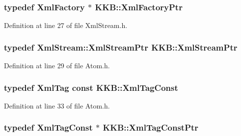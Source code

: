 \subsubsection[{\texorpdfstring{Xml\+Factory\+Ptr}{XmlFactoryPtr}}]{\setlength{\rightskip}{0pt plus 5cm}typedef {\bf Xml\+Factory} $\ast$ {\bf K\+K\+B\+::\+Xml\+Factory\+Ptr}}\hypertarget{namespace_k_k_b_a39be21bf55480cb360e2fd785ad60af1}{}\label{namespace_k_k_b_a39be21bf55480cb360e2fd785ad60af1}


Definition at line 27 of file Xml\+Stream.\+h.

\subsubsection[{\texorpdfstring{Xml\+Stream\+Ptr}{XmlStreamPtr}}]{\setlength{\rightskip}{0pt plus 5cm}typedef {\bf Xml\+Stream\+::\+Xml\+Stream\+Ptr} {\bf K\+K\+B\+::\+Xml\+Stream\+Ptr}}\hypertarget{namespace_k_k_b_a7425eef4d24785a2f1a347bf2bd39114}{}\label{namespace_k_k_b_a7425eef4d24785a2f1a347bf2bd39114}


Definition at line 29 of file Atom.\+h.

\subsubsection[{\texorpdfstring{Xml\+Tag\+Const}{XmlTagConst}}]{\setlength{\rightskip}{0pt plus 5cm}typedef {\bf Xml\+Tag} const {\bf K\+K\+B\+::\+Xml\+Tag\+Const}}\hypertarget{namespace_k_k_b_a598bf24afce47ce534af5cc4bd89c726}{}\label{namespace_k_k_b_a598bf24afce47ce534af5cc4bd89c726}


Definition at line 33 of file Atom.\+h.

\subsubsection[{\texorpdfstring{Xml\+Tag\+Const\+Ptr}{XmlTagConstPtr}}]{\setlength{\rightskip}{0pt plus 5cm}typedef {\bf Xml\+Tag\+Const} $\ast$ {\bf K\+K\+B\+::\+Xml\+Tag\+Const\+Ptr}}\hypertarget{namespace_k_k_b_a5f1b0b1667d79fec26deeff10c43df23}{}\label{namespace_k_k_b_a5f1b0b1667d79fec26deeff10c43df23}


